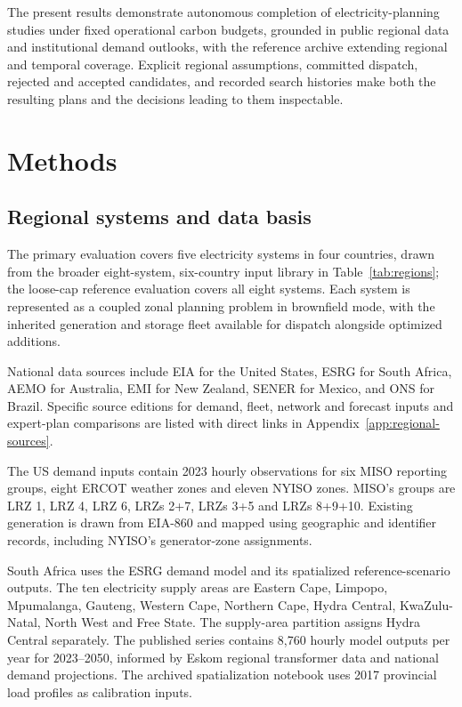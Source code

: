 \documentclass[pdflatex,sn-nature]{sn-jnl}
\begin{document}
The present results demonstrate autonomous completion of electricity-planning studies under fixed operational carbon budgets, grounded in public regional data and institutional demand outlooks, with the reference archive extending regional and temporal coverage. Explicit regional assumptions, committed dispatch, rejected and accepted candidates, and recorded search histories make both the resulting plans and the decisions leading to them inspectable.

\section{Methods}\label{sec:methods}



\subsection{Regional systems and data basis}

The primary evaluation covers five electricity systems in four countries, drawn from the broader eight-system, six-country input library in Table~\ref{tab:regions}; the loose-cap reference evaluation covers all eight systems. Each system is represented as a coupled zonal planning problem in brownfield mode, with the inherited generation and storage fleet available for dispatch alongside optimized additions.

National data sources include EIA for the United States\cite{eiagridmonitor}, ESRG for South Africa\cite{merven2025demand}, AEMO for Australia\cite{aemonemweb}, EMI for New Zealand\cite{emi2026}, SENER for Mexico\cite{sener2024prodesen}, and ONS for Brazil\cite{onsopendata}. Specific source editions for demand, fleet, network and forecast inputs and expert-plan comparisons are listed with direct links in Appendix~\ref{app:regional-sources}.

The US demand inputs contain 2023 hourly observations for six MISO reporting groups, eight ERCOT weather zones and eleven NYISO zones. MISO's groups are LRZ 1, LRZ 4, LRZ 6, LRZs 2+7, LRZs 3+5 and LRZs 8+9+10. Existing generation is drawn from EIA-860 and mapped using geographic and identifier records, including NYISO's generator-zone assignments.

South Africa uses the ESRG demand model and its spatialized reference-scenario outputs. The ten electricity supply areas are Eastern Cape, Limpopo, Mpumalanga, Gauteng, Western Cape, Northern Cape, Hydra Central, KwaZulu-Natal, North West and Free State. The supply-area partition assigns Hydra Central separately. The published series contains 8,760 hourly model outputs per year for 2023--2050, informed by Eskom regional transformer data and national demand projections. The archived spatialization notebook uses 2017 provincial load profiles as calibration inputs.
\end{document}
